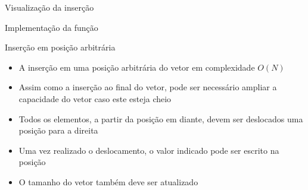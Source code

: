 \begin{frame}[fragile]{Visualização da inserção}


\end{frame}

\begin{frame}[fragile]{Implementação da função }
\end{frame}

\begin{frame}[fragile]{Inserção em posição arbitrária}

    \begin{itemize}
        \item A inserção em uma posição arbitrária  do vetor em complexidade $O(N)$

        \item Assim como a inserção ao final do vetor, pode ser necessário ampliar a capacidade
        do vetor caso este esteja cheio

        \item Todos os elementos, a partir da posição  em diante, devem ser deslocados
        uma posição para a direita

        \item Uma vez realizado o deslocamento, o valor indicado pode ser escrito na posição

        \item O tamanho do vetor também deve ser atualizado
    \end{itemize}

\end{frame}


